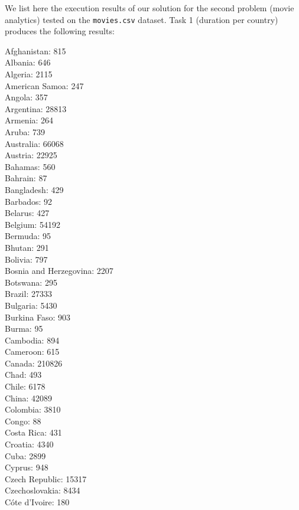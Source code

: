 We list here the execution results of our solution for the second problem (movie analytics) tested on the \texttt{movies.csv} dataset. Task 1 (duration per country) produces the following results:

\begin{multicols}{4}
  \noindent
  Afghanistan:	815
  \\ Albania:	646
  \\ Algeria:	2115
  \\ American Samoa:	247
  \\ Angola:	357
  \\ Argentina:	28813
  \\ Armenia:	264
  \\ Aruba:	739
  \\ Australia:	66068
  \\ Austria:	22925
  \\ Bahamas:	560
  \\ Bahrain:	87
  \\ Bangladesh:	429
  \\ Barbados:	92
  \\ Belarus:	427
  \\ Belgium:	54192
  \\ Bermuda:	95
  \\ Bhutan:	291
  \\ Bolivia:	797
  \\ Bosnia and Herzegovina:	2207
  \\ Botswana:	295
  \\ Brazil:	27333
  \\ Bulgaria:	5430
  \\ Burkina Faso:	903
  \\ Burma:	95
  \\ Cambodia:	894
  \\ Cameroon:	615
  \\ Canada:	210826
  \\ Chad:	493
  \\ Chile:	6178
  \\ China:	42089
  \\ Colombia:	3810
  \\ Congo:	88
  \\ Costa Rica:	431
  \\ Croatia:	4340
  \\ Cuba:	2899
  \\ Cyprus:	948
  \\ Czech Republic:	15317
  \\ Czechoslovakia:	8434
  \\ C\'ote d'Ivoire:	180

\end{multicols}
